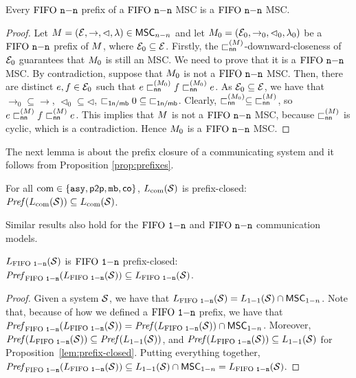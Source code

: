 \begin{proposition}
	\label{prop:prefixes-nn}
	Every $\nn$ prefix of a $\nn$ MSC is a $\nn$ MSC.
\end{proposition}
\begin{proof}
	Let $\msc = (\Events, \procrel, \lhd, \lambda) \in \nnMSCs$ and let $\msc_0 =
	(\Events_0, \procrel_0, \lhd_0, \lambda_0)$ be a $\nn$ prefix of $\msc$, where $\Events_0 \subseteq \Events$. Firstly, the $\nnbowtieofmsc\msc$-downward-closeness of $\Events_0$ guarantees that ${\msc_0}$ is still an MSC. We need to prove that it is a $\nn$ MSC. By contradiction, suppose that $\msc_0$ is not a $\nn$ MSC. Then, there are distinct $e,f \in \Events_0$ such that $e \nnbowtieofmsc{\msc_0} f \nnbowtieofmsc{\msc_0} e$. As $\Events_0 \subseteq \Events$, we have that ${\rightarrow_0} \subseteq {\rightarrow}$, ${\lhd_0} \subseteq {\lhd}$, ${\nnrel0} \subseteq {\nnrel}$. Clearly, $\nnbowtieofmsc{\msc_0} \subseteq\; \nnbowtieofmsc\msc$, so $e \nnbowtieofmsc\msc f \nnbowtieofmsc\msc e$. This implies that $\msc$ is not a $\nn$ MSC, because $\nnbowtieofmsc\msc$ is cyclic, which is a contradiction. Hence $\msc_0$ is a $\nn$ MSC.
\end{proof}

The next lemma is about the prefix closure of a communicating system and it follows from Proposition \ref{prop:prefixes}.

\begin{proposition}\label{lem:prefix-closed}
	For all $\comsymb \in \{\asy, \ppsymb, \mbsymb, \cosymb\}$, $\cL{\Sys}$ is prefix-closed:
	$\Pref{\cL{\Sys}} \subseteq \cL{\Sys}$.
\end{proposition}

Similar results also hold for the $\onen$ and $\nn$ communication models.

\begin{proposition}\label{lem:onen-prefix-closed}
	$\onenL{\Sys}$ is $\onen$ prefix-closed:
	$\Prefonen{\onenL{\Sys}} \subseteq \onenL{\Sys}$.
\end{proposition}
\begin{proof}
	Given a system $\System$, we have that $\onenL{\System} = \ppL{\System} \cap \onenMSCs$. Note that, because of how we defined a $\onen$ prefix, we have that $\Prefonen{\onenL{\Sys}} = \Pref{\onenL{\Sys}} \cap \onenMSCs$. Moreover, $\Pref{\onenL{\Sys}} \subseteq \Pref{\ppL{\Sys}}$, and $\Pref{\onenL{\Sys}} \subseteq \ppL{\Sys}$ for Proposition~\ref{lem:prefix-closed}. Putting everything together, $\Prefonen{\onenL{\Sys}} \subseteq \ppL{\Sys} \cap \onenMSCs = \onenL{\System}$.
\end{proof}

